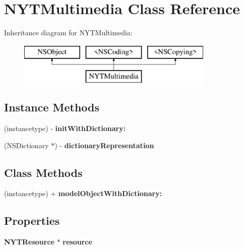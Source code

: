 \section{N\+Y\+T\+Multimedia Class Reference}
\label{interface_n_y_t_multimedia}
Inheritance diagram for N\+Y\+T\+Multimedia\+:\begin{figure}[H]
\begin{center}
\leavevmode
\includegraphics[height=2.000000cm]{interface_n_y_t_multimedia}
\end{center}
\end{figure}
\subsection*{Instance Methods}
\begin{DoxyCompactItemize}
\item 
(instancetype) -\/ {\bfseries init\+With\+Dictionary\+:}\label{interface_n_y_t_multimedia_ad1108aeae1fe6d3c7454aab010f99baf}

\item 
(N\+S\+Dictionary $\ast$) -\/ {\bfseries dictionary\+Representation}\label{interface_n_y_t_multimedia_a6351e774a431558a37f9ce625b00aa4c}

\end{DoxyCompactItemize}
\subsection*{Class Methods}
\begin{DoxyCompactItemize}
\item 
(instancetype) + {\bfseries model\+Object\+With\+Dictionary\+:}\label{interface_n_y_t_multimedia_a6e8fcf1661b57490f4d136c7ba3150df}

\end{DoxyCompactItemize}
\subsection*{Properties}
\begin{DoxyCompactItemize}
\item 
{\bf N\+Y\+T\+Resource} $\ast$ {\bfseries resource}\label{interface_n_y_t_multimedia_afda09c5fa819a3bb7ce521516d720fa1}

\end{DoxyCompactItemize}



